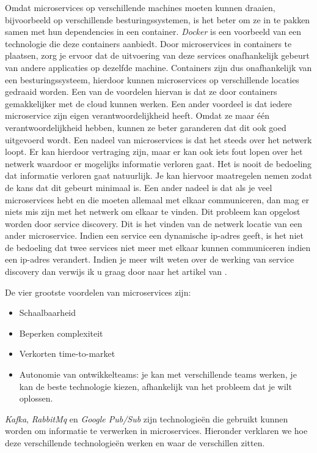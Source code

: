 Omdat microservices op verschillende machines moeten kunnen draaien, bijvoorbeeld op verschillende besturingssystemen, is het beter om ze in te pakken samen met hun dependencies in een container. \emph{Docker} is een voorbeeld van een technologie die deze containers aanbiedt. Door microservices in containers te plaatsen, zorg je ervoor dat de uitvoering van deze services onafhankelijk gebeurt van andere applicaties op dezelfde machine. Containers zijn dus onafhankelijk van een besturingssysteem, hierdoor kunnen microservices op verschillende locaties gedraaid worden. Een van de voordelen hiervan is dat ze door containers gemakkelijker met de cloud kunnen werken. Een ander voordeel is dat iedere microservice zijn eigen verantwoordelijkheid heeft. Omdat ze maar één verantwoordelijkheid hebben, kunnen ze beter garanderen dat dit ook goed uitgevoerd wordt. Een nadeel van microservices is dat het steeds over het netwerk loopt. Er kan hierdoor vertraging zijn, maar er kan ook iets fout lopen over het netwerk waardoor er mogelijks informatie verloren gaat. Het is nooit de bedoeling dat informatie verloren gaat natuurlijk. Je kan hiervoor maatregelen nemen zodat de kans dat dit gebeurt minimaal is. Een ander nadeel is dat als je veel microservices hebt en die moeten allemaal met elkaar communiceren, dan mag er niets mis zijn met het netwerk om elkaar te vinden. Dit probleem kan opgelost worden door service discovery. Dit is het vinden van de netwerk locatie van een ander microservice. Indien een service een dynamische ip-adres geeft, is het niet de bedoeling dat twee services niet meer met elkaar kunnen communiceren indien een ip-adres verandert. Indien je meer wilt weten over de werking van service discovery dan verwijs ik u graag door naar het artikel van \textcite{Xu2019}.

De vier grootste voordelen van microservices zijn: 
\begin{itemize}
    \item Schaalbaarheid
    \item Beperken complexiteit
    \item Verkorten time-to-market
    \item Autonomie van ontwikkelteams: je kan met verschillende teams werken, je kan de beste technologie kiezen, afhankelijk van het probleem dat je wilt oplossen.
\end{itemize}

\emph{Kafka}, \emph{RabbitMq} en \emph{Google Pub/Sub} zijn technologieën die gebruikt kunnen worden om informatie te verwerken in microservices. Hieronder verklaren we hoe deze verschillende technologieën werken en waar de verschillen zitten.

